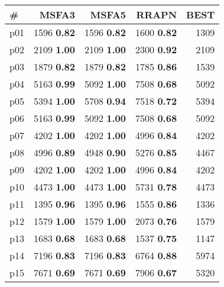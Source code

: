 \begin{tabular}{|l|rrr|r|}
\hline
\textbf{\#} & \textbf{MSFA3} & \textbf{MSFA5} & \textbf{RRAPN} & \textbf{BEST}\\
\hline
p01 & {\footnotesize 1596} \textbf{0.82} & {\footnotesize 1596} \textbf{0.82} & {\footnotesize 1600} \textbf{0.82} & 1309\\
p02 & {\footnotesize 2109} \textbf{1.00} & {\footnotesize 2109} \textbf{1.00} & {\footnotesize 2300} \textbf{0.92} & 2109\\
p03 & {\footnotesize 1879} \textbf{0.82} & {\footnotesize 1879} \textbf{0.82} & {\footnotesize 1785} \textbf{0.86} & 1539\\
p04 & {\footnotesize 5163} \textbf{0.99} & {\footnotesize 5092} \textbf{1.00} & {\footnotesize 7508} \textbf{0.68} & 5092\\
p05 & {\footnotesize 5394} \textbf{1.00} & {\footnotesize 5708} \textbf{0.94} & {\footnotesize 7518} \textbf{0.72} & 5394\\
p06 & {\footnotesize 5163} \textbf{0.99} & {\footnotesize 5092} \textbf{1.00} & {\footnotesize 7508} \textbf{0.68} & 5092\\
p07 & {\footnotesize 4202} \textbf{1.00} & {\footnotesize 4202} \textbf{1.00} & {\footnotesize 4996} \textbf{0.84} & 4202\\
p08 & {\footnotesize 4996} \textbf{0.89} & {\footnotesize 4948} \textbf{0.90} & {\footnotesize 5276} \textbf{0.85} & 4467\\
p09 & {\footnotesize 4202} \textbf{1.00} & {\footnotesize 4202} \textbf{1.00} & {\footnotesize 4996} \textbf{0.84} & 4202\\
p10 & {\footnotesize 4473} \textbf{1.00} & {\footnotesize 4473} \textbf{1.00} & {\footnotesize 5731} \textbf{0.78} & 4473\\
p11 & {\footnotesize 1395} \textbf{0.96} & {\footnotesize 1395} \textbf{0.96} & {\footnotesize 1555} \textbf{0.86} & 1336\\
p12 & {\footnotesize 1579} \textbf{1.00} & {\footnotesize 1579} \textbf{1.00} & {\footnotesize 2073} \textbf{0.76} & 1579\\
p13 & {\footnotesize 1683} \textbf{0.68} & {\footnotesize 1683} \textbf{0.68} & {\footnotesize 1537} \textbf{0.75} & 1147\\
p14 & {\footnotesize 7196} \textbf{0.83} & {\footnotesize 7196} \textbf{0.83} & {\footnotesize 6764} \textbf{0.88} & 5974\\
p15 & {\footnotesize 7671} \textbf{0.69} & {\footnotesize 7671} \textbf{0.69} & {\footnotesize 7906} \textbf{0.67} & 5320\\

\end{tabular}
